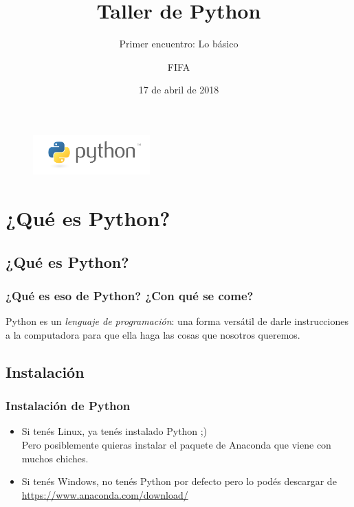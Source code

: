 \documentclass{beamer}
\title{Taller de Python}
\subtitle{Primer encuentro: Lo básico}
\author{FIFA}
\institute[FIFA]{Federación Interestudiantil de Física Argentina}
\date{17 de abril de 2018}
\begin{document}
\begin{frame}
  \titlepage
  
    \begin{figure}
    \centering
    \includegraphics[width=0.4\textwidth]{fig/python-logo.png}
    \end{figure}

\end{frame}


\section{¿Qué es Python?}

\subsection{¿Qué es Python?}
\begin{frame}
    \frametitle{¿Qué es eso de Python? ¿Con qué se come?}
    Python es un \emph{lenguaje de programación}: una forma versátil de darle instrucciones a la computadora para que ella haga las cosas que nosotros queremos.
\end{frame}

\subsection{Instalación}
\begin{frame}
    \frametitle{Instalación de Python}
    \begin{itemize}
        \item Si tenés Linux, ya tenés instalado Python ;)\\Pero posiblemente quieras instalar el paquete de Anaconda que viene con muchos chiches.
        \item Si tenés Windows, no tenés Python por defecto pero lo podés descargar de \url{https://www.anaconda.com/download/}
    \end{itemize}
    
\end{frame}
\end{document}
